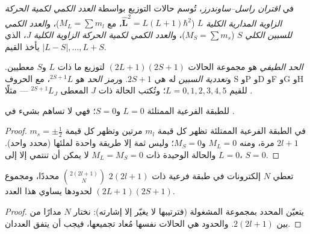 \begin{definition}\label{def:b3:many-electron-atoms:russell-saunders}
في \emph{اقتران راسل--ساوندرز}، تُوسم
حالات التوزيع بواسطة \emph{العدد الكمي لكمية الحركة الزاوية المدارية
الكلية}
$L$ ($\hat{\mathbf L}^2 = L(L+1)\hbar^2$، مع $M_L = \sum m_l$)، و\emph{العدد الكمي
للسبين الكلي} $S$ ($M_S = \sum m_s$)،
و\emph{العدد الكمي لكمية الحركة الزاوية الكلية}
$J$، الذي يأخذ القيم $|L - S|, \dots, L + S$.
\end{definition}

\begin{definition}\label{def:b3:many-electron-atoms:term}
\emph{الحد الطيفي} هو مجموعة الحالات
$(2L+1)(2S+1)$ لتوزيع ما ذات $L$ و$S$ معطيين. 
و\emph{تعددية السبين} له هي $2S + 1$. و\emph{رمز الحد}
 هو ${}^{2S+1}L$، مع الحروف S وP وD وF وG وH
للقيم $L = 0, 1, 2, 3, 4, 5$؛ وتُكتب الحالة ذات $J$ المعطى ${}^{2S+1}L_J$ ---
مثلًا .
\end{definition}

\begin{proposition}\label{prop:b3:many-electron-atoms:closed-shell}
للطبقة الفرعية الممتلئة $L = 0$ و$S = 0$؛ فهي لا تساهم بشيء في
.
\end{proposition}

\begin{proof}
في الطبقة الفرعية الممتلئة تظهر كل قيمة $m_l$ مرتين وتظهر كل قيمة $m_s = \pm\frac12$
$2l+1$ مرة، ومنه $M_L = 0$ و$M_S = 0$؛ وليس ثمة إلا طريقة واحدة
لملئها (محدد واحد). والحالة الوحيدة ذات $M_L = M_S = 0$ لا يمكن أن
تنتمي إلا إلى $L = 0$، $S = 0$.
\end{proof}

\begin{proposition}\label{prop:b3:many-electron-atoms:count}
تعطي $N$ إلكترونات في طبقة فرعية ذات $2(2l+1)$ 
$\binom{2(2l+1)}{N}$ محددًا، ومجموع  $(2L+1)(2S+1)$
لحدودها يساوي هذا العدد.
\end{proposition}

\begin{proof}
يتعيّن المحدد بمجموعة  المشغولة (فترتيبها
لا يغيّر إلا إشارته): نختار $N$ مدارًا من بين $2(2l+1)$. والحدود هي
الحالات نفسها مُعاد تجميعها، فيجب أن يتفق العددان.
\end{proof}

